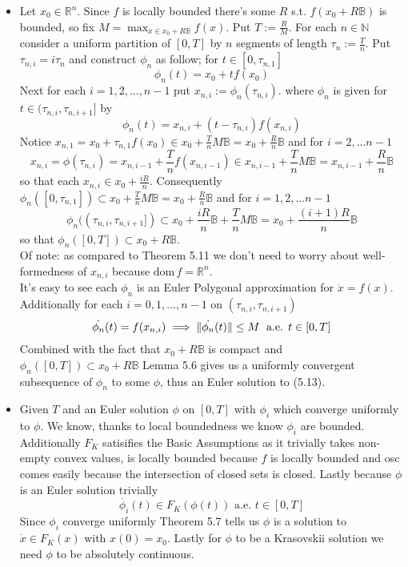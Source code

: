 \documentclass{article}
\newenvironment{ex}[1]
  {\renewcommand\theexercise{#1}\exercise}
  {\endexercise}
\newcommand{\B}{\mathbb{B}}
\newcommand{\R}[1]{\mathbb{R}^{#1}}
\begin{document}
\begin{ex}{5.14} %
  \begin{itemize}
    \item
      Let $x_0 \in \R{n}$. Since $f$ is locally bounded there's some $R$ s.t. $f(x_0 + R\B)$ is bounded, so fix $M = \max_{x \in x_0 + R\B} f(x)$. Put $T := \frac{R}{M}$. For each $n \in \mathbb{N}$ consider a uniform partition of $[0, T]$ by $n$ segments of length $\tau_n := \frac{T}{n}$. Put $\tau_{n,i} = i \tau_n$ and construct $\phi_n$ as follow; for $t \in [0, \tau_{n, 1}]$
      $$
      \phi_n(t) = x_0 + t f(x_0)
      $$
      Next for each $i = 1, 2, ..., n-1$ put $x_{n,i} := \phi_n(\tau_{n, i})$. where $\phi_n$ is given for $t \in (\tau_{n,i}, \tau_{n,i+1}]$ by
      $$
      \phi_n(t) = x_{n,i} + (t - \tau_{n,i}) f(x_{n,i})
      $$
      Notice $x_{n,1} = x_0 + \tau_{n,1}f(x_0) \in x_0 + \frac{T}{n} M \B = x_0 + \frac{R}{n} \B$ and for $i = 2, ... n-1$
      $$
      x_{n, i} = \phi(\tau_{n,i}) = x_{n,i-1} + \frac{T}{n} f(x_{n,i-1}) \in x_{n,i-1} + \frac{T}{n} M \B = x_{n,i-1} + \frac{R}{n} \B
      $$
      so that each $x_{n,i} \in x_0 + \frac{iR}{n}$. Consequently $\phi_n([0, \tau_{n,1}]) \subset x_0 + \frac{T}{n} M \B = x_0 + \frac{R}{n} \B$ and for $i = 1, 2, ... n-1$
      $$
      \phi_n((\tau_{n, i}, \tau_{n, i+1}]) \subset x_0 + \frac{iR}{n} \B + \frac{T}{n} M \B = x_0 + \frac{(i+1)R}{n} \B
      $$
      so that $\phi_n([0, T]) \subset x_0 + R \B$. \, \\

      Of note: as compared to Theorem 5.11 we don't need to worry about well-formedness of $x_{n,i}$ because $\textrm{dom} \, f = \R{n}$. \, \\

      It's easy to see each $\phi_n$ is an Euler Polygonal approximation for $\dot{x} = f(x)$. Additionally for each $i = 0, 1, ..., n-1$ on $(\tau_{n,i}, \tau_{n,i+1})$
      $$
      \dot{\phi_n}(t) = f(x_{n, i}) \implies \lVert\dot{\phi_n}(t)\rVert \le M \; \text{ a.e. } t \in [0, T]
      $$
      Combined with the fact that $x_0 + R \B$ is compact and $\phi_n([0, T]) \subset x_0 + R \B$ Lemma 5.6 gives us a uniformly convergent subsequence of $\phi_n$ to some $\phi$, thus an Euler solution to (5.13). \, \\
    \item
      Given $T$ and an Euler solution $\phi$ on $[0, T]$ with $\phi_i$ which converge uniformly to $\phi$. We know, thanks to local boundedness we know $\phi_i$ are bounded. Additionally $F_K$ satisifies the Basic Assumptions as it trivially takes non-empty convex values, is locally bounded because $f$ is locally bounded and osc comes easily because the intersection of closed sets is closed. Lastly because $\phi$ is an Euler solution trivially
      $$\dot{\phi_i}(t) \in F_K(\phi(t)) \text{ a.e. } t \in [0, T]$$
      Since $\phi_i$ converge uniformly Theorem 5.7 tells us $\phi$ is a solution to $\dot{x} \in F_K(x)$ with $x(0) = x_0$. Lastly for $\phi$ to be a Krasovskii solution we need $\phi$ to be absolutely continuous. \, \\


\end{itemize}
\end{ex}
\end{document}
